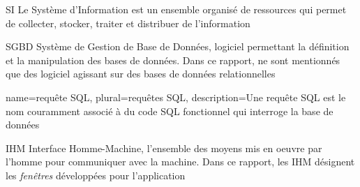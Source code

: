                            {SI}
                           {Le Système d'Information est un ensemble organisé de ressources qui permet de collecter, stocker, traiter et distribuer de l'information}

                           {SGBD}
                           {Système de Gestion de Base de Données, logiciel permettant la définition et la manipulation des bases de données. Dans ce rapport, ne sont mentionnés que des logiciel agissant sur des bases de données relationnelles}

        {name={requête SQL},
        plural={requêtes SQL},
        description=Une requête SQL est le nom couramment associé à du code SQL fonctionnel qui interroge la base de données}

	{IHM}
	{Interface Homme-Machine, l'ensemble des moyens mis en oeuvre par l'homme pour communiquer avec la machine.
	Dans ce rapport, les IHM désignent les \textit{fenêtres} développées pour l'application}
